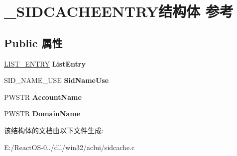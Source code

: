 \hypertarget{struct___s_i_d_c_a_c_h_e_e_n_t_r_y}{}\section{\+\_\+\+S\+I\+D\+C\+A\+C\+H\+E\+E\+N\+T\+R\+Y结构体 参考}
\label{struct___s_i_d_c_a_c_h_e_e_n_t_r_y}
\subsection*{Public 属性}
\begin{DoxyCompactItemize}
\item 
\mbox{\label{struct___s_i_d_c_a_c_h_e_e_n_t_r_y_a46d6772f2272679faa035a2b5f9d4ada}} 
\hyperlink{struct___l_i_s_t___e_n_t_r_y}{L\+I\+S\+T\+\_\+\+E\+N\+T\+RY} {\bfseries List\+Entry}
\item 
\mbox{\label{struct___s_i_d_c_a_c_h_e_e_n_t_r_y_a1bbf1a189e2df862347b7beec78390bb}} 
S\+I\+D\+\_\+\+N\+A\+M\+E\+\_\+\+U\+SE {\bfseries Sid\+Name\+Use}
\item 
\mbox{\label{struct___s_i_d_c_a_c_h_e_e_n_t_r_y_aa8338a5eb857f1bd5cc4a4999fd487c8}} 
P\+W\+S\+TR {\bfseries Account\+Name}
\item 
\mbox{\label{struct___s_i_d_c_a_c_h_e_e_n_t_r_y_a21f72a4c6be623b184565ac7d114f4ba}} 
P\+W\+S\+TR {\bfseries Domain\+Name}
\end{DoxyCompactItemize}


该结构体的文档由以下文件生成\+:\begin{DoxyCompactItemize}
\item 
E\+:/\+React\+O\+S-\/0../dll/win32/aclui/sidcache.\+c\end{DoxyCompactItemize}
